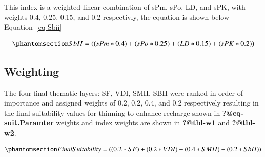 \documentclass[
  number,
  preprint,
  3p,
  onecolumn]{elsarticle}
\begin{document}
This index is a weighted linear combination of sPm, sPo, LD, and sPK,
with weights 0.4, 0.25, 0.15, and 0.2 respectivly, the equation is shown
below Equation~\ref{eq-Sbii}

\begin{equation}\phantomsection\label{eq-Sbii}{
SbII = ((sPm * 0.4) + (sPo * 0.25) + (LD * 0.15) + (sPK * 0.2))
}\end{equation}

\subsection{Weighting}\label{weighting}

The four final thematic layers: SF, VDI, SMII, SBII were ranked in order
of importance and assigned weights of 0.2, 0.2, 0.4, and 0.2
respectively resulting in the final suitability values for thinning to
enhance recharge shown in \textbf{?@eq-suit.Paramter} weights and index
weights are shown in \textbf{?@tbl-w1} and \textbf{?@tbl-w2}.

\begin{equation}\phantomsection\label{eq-suit}{
Final Suitability = ((0.2 * SF) + (0.2 * VDI) + (0.4 * SMII) + (0.2 * SbII))}\end{equation}
\end{document}
